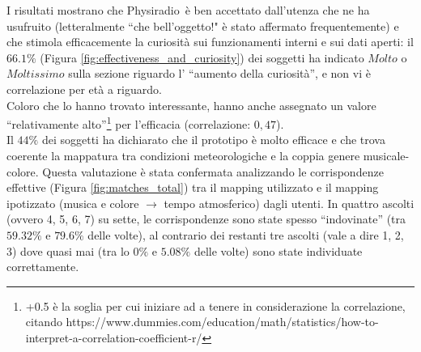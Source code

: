\documentclass[12pt,a4paper]{report}
\newcommand{\physiradio}{Physiradio} %
\begin{document}
I risultati mostrano che \physiradio\ è ben accettato dall'utenza che ne ha usufruito (letteralmente ``che bell'oggetto!" è stato affermato frequentemente) e che stimola efficacemente la curiosità sui funzionamenti interni e sui dati aperti: il $66.1\% $ (Figura \ref{fig:effectiveness_and_curiosity}) dei soggetti ha indicato $Molto$ o $Moltissimo$ sulla sezione riguardo l' ``aumento della curiosità'', e non vi è correlazione per età a riguardo. \\ %
Coloro che lo hanno trovato interessante, hanno anche assegnato un valore ``relativamente alto''\footnote{+0.5 è la soglia per cui iniziare ad a tenere in considerazione la correlazione, citando https://www.dummies.com/education/math/statistics/how-to-interpret-a-correlation-coefficient-r/} per l'efficacia (correlazione: $0,47$). \\%
Il $44\%$ dei soggetti ha dichiarato che il prototipo è molto efficace e che trova coerente la mappatura tra condizioni meteorologiche e la coppia genere musicale-colore. Questa valutazione è stata confermata analizzando le corrispondenze effettive (Figura \ref{fig:matches_total}) tra il mapping utilizzato e il mapping ipotizzato (musica e colore $\rightarrow$ tempo atmosferico) dagli utenti. In quattro ascolti (ovvero 4, 5, 6, 7) su sette, le corrispondenze sono state spesso ``indovinate'' (tra $59.32\% $ e $79.6\%$ delle volte), al contrario dei restanti tre ascolti (vale a dire 1, 2, 3) dove quasi mai (tra lo $0\%$ e $5.08\%$ delle volte) sono state individuate correttamente.\\
\end{document}
